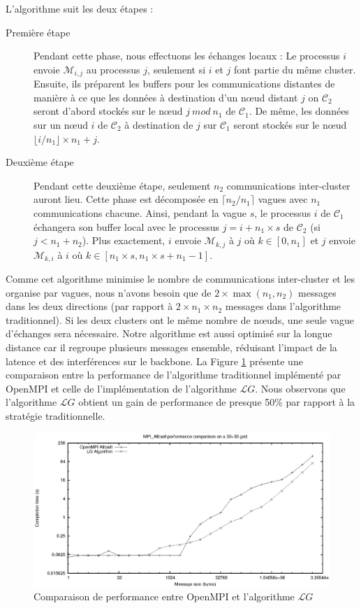 L'algorithme suit les deux étapes : 
\begin{description}
	\item[Première étape] Pendant cette phase, nous effectuons les échanges locaux : Le processus $i$  envoie ${\mathcal M}_{i,j}$ au processus $j$, seulement si $i$ et $j$ font partie du même cluster. Ensuite, ils préparent les buffers pour les communications distantes de manière à ce que les données à destination d'un n{\oe}ud distant $j$ on ${\mathcal C}_2$ seront d'abord stockés sur le n{\oe}ud $j~ mod~ n_1$ de ${\mathcal C}_1$. De même, les données sur un n{\oe}ud $i$ de ${\mathcal C}_2$ à destination de $j$ sur ${\mathcal C}_1$ seront stockés sur le n{\oe}ud $ \lfloor i/n_1 \rfloor \times n_1 + j $.
	\item[Deuxième étape] Pendant cette deuxième étape, seulement $n_2$ communications inter-cluster auront lieu. Cette phase est décomposée en $\lceil n_2/n_1\rceil$ vagues avec $n_1$ communications chacune. Ainsi, pendant la vague $s$, le processus  $i$ de ${\mathcal C}_1$ échangera son buffer local avec le processus $j=i+n_1\times s$ de ${\mathcal C}_2$ (si $j < n_1+n_2$). Plus exactement, $i$ envoie  ${\mathcal M}_{k,j}$ à $j$ où $k\in [0,n_1]$ et $j$ envoie ${\mathcal M}_{k,i}$ à $i$ où $k\in[n_1\times s,n_1\times s+n_1-1]$.
\end{description}

Comme cet algorithme minimise le nombre de communications inter-cluster et les organise par vagues, nous n'avons besoin que de $2\times \max(n_1,n_2)$ messages dans les deux directions (par rapport à  $2\times n_1 \times n_2$ messages dans l'algorithme traditionnel). Si les deux clusters ont le même nombre de n{\oe}uds, une seule vague d'échanges sera nécessaire. Notre algorithme est aussi optimisé sur la longue distance car il regroupe plusieurs messages ensemble, réduisant l'impact de la latence et des interférences sur le backbone. La Figure \ref{Figure: comp} présente une comparaison entre la performance de l'algorithme traditionnel implémenté par OpenMPI et celle de l'implémentation de l'algorithme ${\mathcal LG}$. Nous observons que l'algorithme ${\mathcal LG}$ obtient un gain de performance de presque 50\% par rapport à la stratégie traditionnelle.

\begin{figure}
	\centering
	\includegraphics[width=0.7\columnwidth]{images/comp}
	\caption{\label{Figure: comp}Comparaison de performance entre OpenMPI et l'algorithme ${\mathcal LG}$}
\end{figure}

